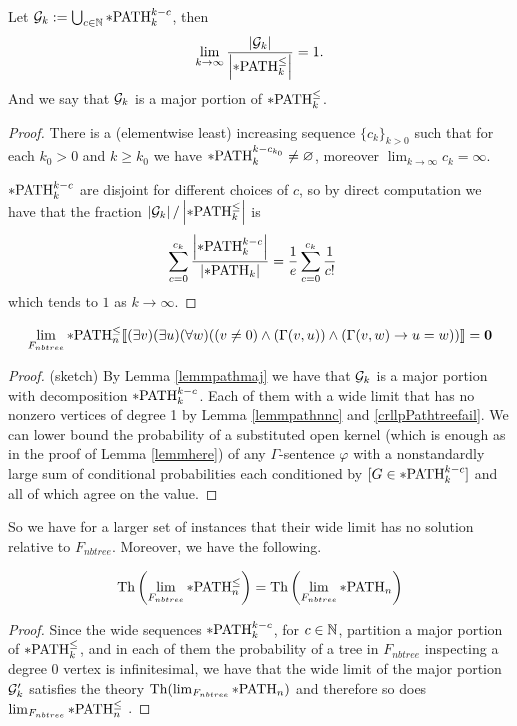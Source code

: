 \begin{lemm}\label{lemmpathmaj}
Let $\mathcal{G}_k:=\bigcup_{c\in\mathbb{N}}*\text{PATH}^{k-c}_k$, then
\[\lim_{k\to\infty}\frac{\left|{\mathcal{G}_k}\right|}{\left|{*\text{PATH}^\leq_k}\right|}=1.\]
And we say that $\mathcal{G}_k$ is a major portion of $*\text{PATH}^\leq_k$.
\end{lemm}
\begin{proof}
There is a (elementwise least) increasing sequence $\{c_k\}_{k>0}$ such that for each $k_0>0$ and $k\geq k_0$ we have $*\text{PATH}_k^{k-{c_{k_0}}}\neq \varnothing$, moreover $\lim_{k\to\infty} c_k = \infty$.

$*\text{PATH}^{k-c}_k$ are disjoint for different choices of $c$, so by direct computation we have that the fraction $\left|{\mathcal{G}_k}\right|/\left|{*\text{PATH}^\leq_k}\right|$ is
\begin{align}
\sum_{c=0}^{c_k} \frac{\left|{*\text{PATH}_k^{k-c}}\right|}{\left|{*\text{PATH}_k}\right|}&=\frac{1}{e}\sum_{c=0}^{c_k}\frac{1}{c!}
\end{align}
which tends to $1$ as $k\to\infty$.
\end{proof}

\begin{thrm}
\[\lim_{F_{nbtree}}*\text{PATH}^\leq_n\llbracket(\exists v)(\exists u)(\forall w)((v\not=0)\land (\Gamma(v,u)) \land(\Gamma(v,w) \to u=w))\rrbracket=\textbf{0}\]
\end{thrm}
\begin{proof}(sketch)
By Lemma \ref{lemmpathmaj} we have that $\mathcal{G}_k$ is a major portion with decomposition $*\text{PATH}_k^{k-c}$. Each of them with a wide limit that has no nonzero vertices of degree 1 by Lemma \ref{lemmpathnnc} and \ref{crllpPathtreefail}. We can lower bound the probability of a substituted open kernel (which is enough as in the proof of Lemma \ref{lemmhere}) of any $\Gamma$-sentence $\varphi$ with a nonstandardly large sum of conditional probabilities each conditioned by $[G\in*\text{PATH}_k^{k-c}]$ and all of which agree on the value.
\end{proof}

So we have for a larger set of instances that their wide limit has no solution relative to $F_{nbtree}$. Moreover, we have the following.

\begin{crll}\label{crllpPATHl}
\[\text{Th}\left(\lim_{F_{nbtree}}*\text{PATH}^\leq_n\right)=\text{Th}\left(\lim_{F_{nbtree}}*\text{PATH}_n\right)\]
\end{crll}
\begin{proof}
Since the wide sequences $*\text{PATH}_k^{k-c}$, for $c\in\mathbb{N}$, partition a major portion of $*\text{PATH}^\leq_k$, and in each of them the probability of a tree in $F_{nbtree}$ inspecting a degree 0 vertex is infinitesimal, we have that the wide limit of the major portion $\mathcal{G}_k'$ satisfies the theory $\text{Th}(\lim_{F_{nbtree}}*\text{PATH}_n)$ and therefore so does $\lim_{F_{nbtree}}*\text{PATH}^\leq_n$ .
\end{proof}



